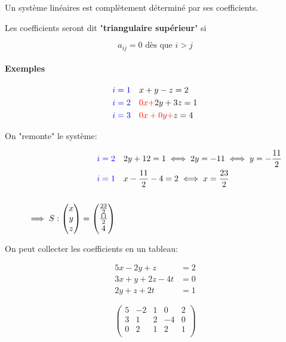 \documentclass[
    11pt,
    a4paper,
    oneside,
    headinlcude, footinclude,
    twoside,
]{report}
\newcommand{\myVector}[3]{\begin{pmatrix}#1\\#2\\#3\end{pmatrix}}
\begin{document}
Un système linéaires est complètement déterminé par ses coefficients.

Les coefficients seront dit "\textbf{triangulaire supérieur}" si 

$$a_{ij} = 0 \textrm{ dès que } i>j$$

\paragraph{Exemples}
\label{par:exemples}

\[
    \begin{split}
        {\color{blue} i = 1}&\quad x + y - z = 2\\
        {\color{blue} i = 2}&\quad {\color{red} 0x +} 2y + 3z = 1\\
        {\color{blue} i = 3}&\quad {\color{red} 0x + 0y +} z = 4\\
    \end{split}
\]

On "remonte" le système:

\[
    \begin{split}
        {\color{blue} i = 2}&\quad  2y + 12 = 1 \iff 2y = -11 \iff y = -\frac{11}{2}\\
        {\color{blue} i = 1}&\quad  x - \frac{11}{2} - 4 = 2 \iff x = \frac{23}{2}\\
        \\
        \implies S: \myVector{x}{y}{z} = \myVector{\frac{23}{2}}{\frac{11}{2}}{4}
    \end{split}
\]

On peut collecter les coefficients en un tableau:

\[
    \begin{split}
    5x - 2y + z &= 2\\
    3x + y + 2z - 4t &= 0\\
    2y + z + 2t &= 1
    \end{split}
\]

\begin{equation}
    \label{eq:2}
    \left(\begin{array}{cccc|c}
         5 & -2 & 1 & 0 & 2\\
         3 & 1 & 2 & -4 & 0\\
         0 & 2 & 1 & 2 & 1\\
    \end{array}\right)
\end{equation}
\end{document}
